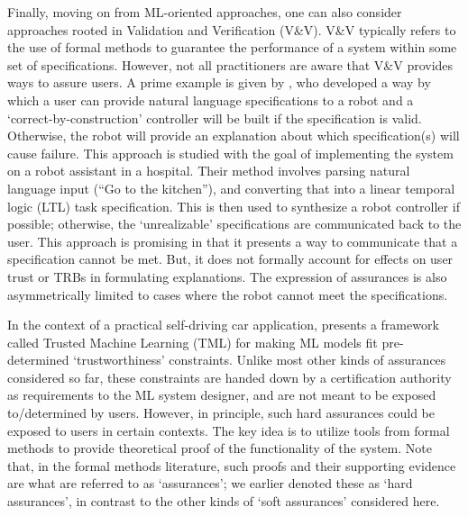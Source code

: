 Finally, moving on from ML-oriented approaches, one can also consider approaches rooted in Validation and Verification (V\&V). V\&V typically refers to the use of formal methods to guarantee the performance of a system within some set of specifications. However, not all practitioners are aware that V\&V provides ways to assure users. A prime example is given by \citet{Raman2013-mz}, who developed a way by which a user can provide natural language specifications to a robot and a `correct-by-construction' controller will be built if the specification is valid. Otherwise, the robot will provide an explanation about which specification(s) will cause failure. This approach is studied with the goal of implementing the system on a robot assistant in a hospital. Their method involves parsing natural language input (``Go to the kitchen''), and converting that into a linear temporal logic (LTL) task specification. This is then used to synthesize a robot controller if possible; otherwise, the `unrealizable' specifications are communicated back to the user. This approach is promising in that it presents a way to communicate that a specification cannot be met. But, it does not formally account for effects on user trust or TRBs in formulating explanations. The expression of assurances is also asymmetrically limited to cases where the robot cannot meet the specifications. 

In the context of a practical self-driving car application, \citet{Ghosh2016-dl} presents a framework called Trusted Machine Learning (TML) for making ML models fit pre-determined `trustworthiness' constraints. Unlike most other kinds of assurances considered so far, these constraints are handed down by a certification authority as requirements to the ML system designer, and are not meant to be exposed to/determined by users. However, in principle, such hard assurances could be exposed to users in certain contexts. The key idea is to utilize tools from formal methods to provide theoretical proof of the functionality of the system. Note that, in the formal methods literature, such proofs and their supporting evidence are what are referred to as `assurances'; we earlier denoted these as `hard assurances', in contrast to the other kinds of `soft assurances' considered here. 

